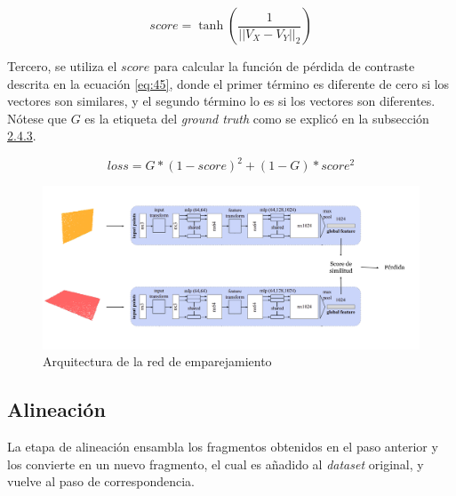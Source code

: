 \begin{equation} \label{eq:43}
    score = \tanh\left(\frac{1}{||V_X - V_Y||_2}\right)
\end{equation}

Tercero, se utiliza el $score$ para calcular la función de pérdida de contraste descrita en la ecuación \ref{eq:45}, donde el primer término es diferente de cero si los vectores son similares, y el segundo término lo es si los vectores son diferentes. Nótese que $G$ es la etiqueta del \textit{ground truth} como se explicó en la subsección \hyperref[section:contrastive]{2.4.3}.

\begin{equation} \label{eq:45}
    loss = G * (1 - score)^2 + (1 - G) * score^2
\end{equation}

\begin{figure}[!h]
    \centering
     \includegraphics[scale=0.135]{images/siamesa.png}
    \caption{Arquitectura de la red de emparejamiento}
    \label{fig:siamesa}
\end{figure}


\subsection{Alineación}
La etapa de alineación ensambla los fragmentos obtenidos en el paso anterior y los convierte en un nuevo fragmento, el cual es añadido al \textit{dataset} original, y vuelve al paso de correspondencia.

